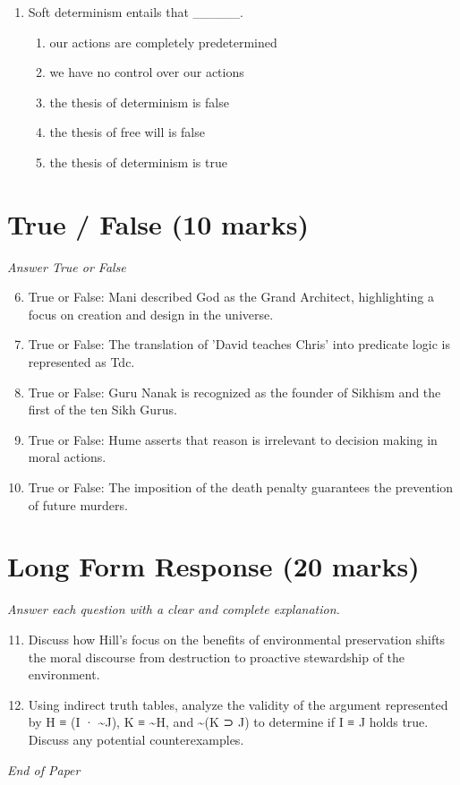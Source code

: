 \documentclass[12pt]{article}
\begin{document}
\begin{enumerate}[label=\arabic*.]
\begin{enumerate}[label=(\alph*)]
    \item negotiable and fluctuating.
    \item indirect but fundamental.
\end{enumerate}
\item Soft determinism entails that \_\_\_\_\_.
\begin{enumerate}[label=(\alph*)]
    \item our actions are completely predetermined
    \item we have no control over our actions
    \item the thesis of determinism is false
    \item the thesis of free will is false
    \item the thesis of determinism is true
\end{enumerate}
\end{enumerate}

\section*{True / False (10 marks)}
\textit{Answer True or False}
\begin{enumerate}[label=\arabic*.]
\setcounter{enumi}{5}
\item True or False: Mani described God as the Grand Architect, highlighting a focus on creation and design in the universe.
\item True or False: The translation of 'David teaches Chris' into predicate logic is represented as Tdc.
\item True or False: Guru Nanak is recognized as the founder of Sikhism and the first of the ten Sikh Gurus.
\item True or False: Hume asserts that reason is irrelevant to decision making in moral actions.
\item True or False: The imposition of the death penalty guarantees the prevention of future murders.
\end{enumerate}

\section*{Long Form Response (20 marks)}
\textit{Answer each question with a clear and complete explanation.}
\begin{enumerate}[label=\arabic*.]
\setcounter{enumi}{10}
\item Discuss how Hill's focus on the benefits of environmental preservation shifts the moral discourse from destruction to proactive stewardship of the environment.
\item Using indirect truth tables, analyze the validity of the argument represented by H ≡ (I · \textasciitilde{}J), K ≡ \textasciitilde{}H, and \textasciitilde{}(K ⊃ J) to determine if I ≡ J holds true. Discuss any potential counterexamples.
\end{enumerate}

\vfill
\noindent\textit{End of Paper}
\end{document}
